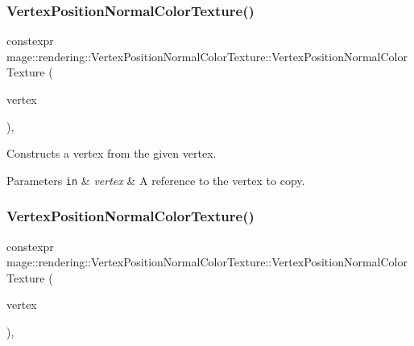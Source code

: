 \subsubsection{\texorpdfstring{Vertex\+Position\+Normal\+Color\+Texture()}{VertexPositionNormalColorTexture()}\hspace{0.1cm}{\footnotesize\ttfamily [3/4]}}
{\footnotesize\ttfamily constexpr mage\+::rendering\+::\+Vertex\+Position\+Normal\+Color\+Texture\+::\+Vertex\+Position\+Normal\+Color\+Texture (\begin{DoxyParamCaption}\item[{const \mbox{\hyperlink{structmage_1_1rendering_1_1_vertex_position_normal_color_texture}{Vertex\+Position\+Normal\+Color\+Texture}} \&}]{vertex }\end{DoxyParamCaption})\hspace{0.3cm}{\ttfamily [default]}, {\ttfamily [noexcept]}}

Constructs a vertex from the given vertex.


\begin{DoxyParams}[1]{Parameters}
\mbox{\tt in}  & {\em vertex} & A reference to the vertex to copy. \\
\hline
\end{DoxyParams}
\mbox{\label{structmage_1_1rendering_1_1_vertex_position_normal_color_texture_a78fbb9ec2a5c4b26ab789c966ba89e64}} 
\subsubsection{\texorpdfstring{Vertex\+Position\+Normal\+Color\+Texture()}{VertexPositionNormalColorTexture()}\hspace{0.1cm}{\footnotesize\ttfamily [4/4]}}
{\footnotesize\ttfamily constexpr mage\+::rendering\+::\+Vertex\+Position\+Normal\+Color\+Texture\+::\+Vertex\+Position\+Normal\+Color\+Texture (\begin{DoxyParamCaption}\item[{\mbox{\hyperlink{structmage_1_1rendering_1_1_vertex_position_normal_color_texture}{Vertex\+Position\+Normal\+Color\+Texture}} \&\&}]{vertex }\end{DoxyParamCaption})\hspace{0.3cm}{\ttfamily [default]}, {\ttfamily [noexcept]}}

